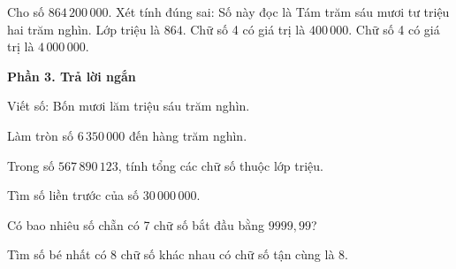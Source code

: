 \begin{ex} %
Cho số $864\,200\,000$. Xét tính đúng sai:
\choiceTF
{\True Số này đọc là Tám trăm sáu mươi tư triệu hai trăm nghìn.}
{\True Lớp triệu là $864$.}
{Chữ số 4 có giá trị là $400\,000$.}
{\True Chữ số 4 có giá trị là $4\,000\,000$.}
\end{ex}

\textbf{Phần 3. Trả lời ngắn}

\begin{ex} %
Viết số: Bốn mươi lăm triệu sáu trăm nghìn.
\end{ex}

\begin{ex} %
Làm tròn số $6\,350\,000$ đến hàng trăm nghìn.
\end{ex}

\begin{ex} %
Trong số $567\,890\,123$, tính tổng các chữ số thuộc lớp triệu.
\end{ex}

\begin{ex} %
Tìm số liền trước của số $30\,000\,000$.
\end{ex}

\begin{ex} %
Có bao nhiêu số chẵn có 7 chữ số bắt đầu bằng $9999,99$?
\end{ex}

\begin{ex} %
Tìm số bé nhất có 8 chữ số khác nhau có chữ số tận cùng là 8.
\end{ex}

